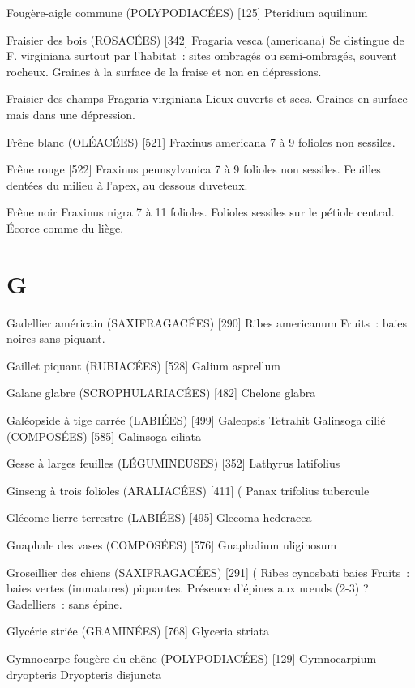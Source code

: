 \documentclass[book,12pt,a4paper,onecolumn,openany]{memoir}
\begin{document}
Fougère-aigle commune (POLYPODIACÉES) [125]
				Pteridium aquilinum

Fraisier des bois (ROSACÉES)  [342]
				Fragaria vesca (americana)
Se distingue de F. virginiana surtout par l’habitat : sites ombragés ou semi-ombragés, souvent rocheux. Graines à la surface de la fraise et non en dépressions.

Fraisier des champs
				Fragaria virginiana
Lieux ouverts et secs. Graines en surface mais dans une dépression.

Frêne blanc (OLÉACÉES)  [521]
				Fraxinus americana
7 à 9 folioles non sessiles.



Frêne rouge  [522]
				Fraxinus pennsylvanica
7 à 9 folioles non sessiles. Feuilles dentées du milieu à l’apex, au dessous duveteux.

Frêne noir
				Fraxinus nigra
7 à 11 folioles. Folioles sessiles sur le pétiole central.
Écorce comme du liège.

\chapter*{G}

Gadellier américain (SAXIFRAGACÉES)  [290]
				Ribes americanum
Fruits : baies noires sans piquant.

Gaillet piquant (RUBIACÉES)  [528]
				Galium asprellum

Galane glabre (SCROPHULARIACÉES)  [482]
				Chelone glabra

Galéopside à tige carrée (LABIÉES)  [499]
				Galeopsis Tetrahit
Galinsoga cilié (COMPOSÉES)  [585]
				Galinsoga ciliata

Gesse à larges feuilles (LÉGUMINEUSES)  [352]
				Lathyrus latifolius

Ginseng à trois folioles (ARALIACÉES)  [411]		(
				Panax trifolius				tubercule

Glécome lierre-terrestre (LABIÉES)  [495]
				Glecoma hederacea

Gnaphale des vases (COMPOSÉES)  [576]
				Gnaphalium uliginosum

Groseillier des chiens (SAXIFRAGACÉES)  [291]			(
				Ribes cynosbati					baies
Fruits : baies vertes (immatures) piquantes.
Présence d’épines aux nœuds (2-3) ? Gadelliers : sans épine.

Glycérie striée (GRAMINÉES)  [768]
				Glyceria striata


Gymnocarpe fougère du chêne (POLYPODIACÉES) [129]
				Gymnocarpium dryopteris
				Dryopteris disjuncta
\end{document}
